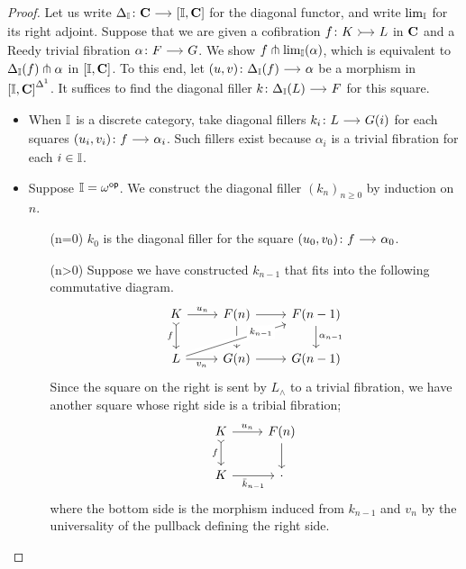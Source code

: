 \documentclass[a4paper,  dvipsnames, 11pt]{amsart}
\begin{document}
\begin{proof}
	Let us write $\Delta_\dI\colon\one{C}\arr\left[\dI,\one{C}\right]$
	for the diagonal functor, and write $\lim_{\mathbb{I}}$ for its right adjoint.
	Suppose that we are given a cofibration $f\colon K\arr[tail]L$ in $\mathbf{C}$
	and a Reedy trivial fibration $\alpha\colon F\arr G$.
	We show $f\pitchfork \lim_{\mathbb{I}}(\alpha)$, which is equivalent to $\Delta_{\mathbb{I}}(f)\pitchfork \alpha$ in $\left[\mathbb{I},\mathbf{C}\right]$.
	To this end,
	let $(u,v)\colon\Delta_\dI(f)\arr\alpha$ be a morphism in $\left[\mathbb{I},\mathbf{C}\right]^{\Delta^1}$.
	It suffices to find the diagonal filler $k\colon\Delta_\dI(L)\arr F$ for this square.
	\begin{itemize}
		\item %
			When $\mathbb{I}$ is a discrete category,
			take diagonal fillers $k_i\colon L\arr G(i)$ for
			each squares $(u_i,v_i)\colon f\arr\alpha_i$.
			Such fillers exist because $\alpha_i$ is a trivial fibration for each $i\in\mathbb{I}$.
		\item %
			Suppose $\mathbb{I}=\omega^{\mathsf{op}}$.
			We construct the diagonal filler $(k_n)_{n\geq 0}$ by induction on $n$.
			\begin{itemize}
				\item[(n=0)] %
					$k_0$ is the diagonal filler for the square $(u_0,v_0)\colon f\arr\alpha_0$.
				\item[(n>0)] %
					Suppose we have constructed $k_{n-1}$ that fits into the following commutative diagram.
					\[
						\begin{tikzcd}
							K
							\ar[r,"u_n"]
							\ar[d,tail,"f"']
								&
								F(n)
								\ar[r]
								\ar[d]
									&
									F(n-1)
									\ar[d,"\alpha_{n-1}"]
							\\
							L
							\ar[rru,crossing over,"k_{n-1}"{description,near end}]
							\ar[r,"v_n"']
								&
								G(n)
								\ar[r]
									&
									G(n-1)
						\end{tikzcd}
					\]
					Since the square on the right is sent by $L_\land$ to a trivial fibration,
					we have another square whose right side is a tribial fibration;
					\[
						\begin{tikzcd}
							K
							\ar[r,"u_n"]
							\ar[d,"f"',tail]
								&
								F(n)
								\ar[d]
							\\
							K
							\ar[r,"\bar{k}_{n-1}"']
								&
								\cdot
						\end{tikzcd}
					\]
					where the bottom side is the morphism induced from $k_{n-1}$ and $v_n$ by the universality of the pullback defining the right side.

\end{itemize}
\end{itemize}
\end{proof}
\end{document}

